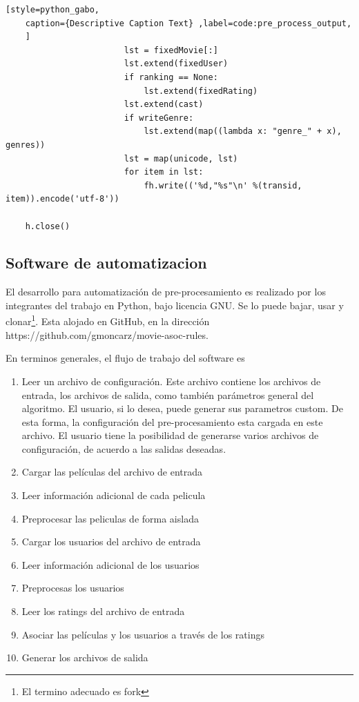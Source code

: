 \documentclass[journal]{IEEEtran}
\begin{document}
\begin{lstlisting}[style=python_gabo,
	caption={Descriptive Caption Text} ,label=code:pre_process_output,
	]
                        lst = fixedMovie[:]
                        lst.extend(fixedUser)
                        if ranking == None:
                            lst.extend(fixedRating)
                        lst.extend(cast)
                        if writeGenre:
                            lst.extend(map((lambda x: "genre_" + x), genres))
                        lst = map(unicode, lst)
                        for item in lst:
                            fh.write(('%d,"%s"\n' %(transid, item)).encode('utf-8'))

    h.close()
\end{lstlisting}


\subsection{Software de automatizacion}
El desarrollo para automatización de pre-procesamiento es realizado por 
los integrantes del trabajo en Python, bajo licencia GNU. Se lo puede bajar,
usar y clonar\footnote{El termino adecuado es fork}. Esta alojado en GitHub, en la 
dirección https://github.com/gmoncarz/movie-asoc-rules. 

En terminos generales, el flujo de trabajo del software es
\begin{enumerate}
\item Leer un archivo de configuración. Este archivo 
contiene los archivos de entrada, los archivos de salida,
como también parámetros general del algoritmo.
El usuario, si lo desea, puede generar sus parametros custom. De
esta forma, la configuración del pre-procesamiento esta cargada en este
archivo. El usuario tiene la posibilidad de generarse varios archivos
de configuración, de acuerdo a las salidas deseadas.
\item Cargar las películas del archivo de entrada
\item Leer información adicional de cada pelicula
\item Preprocesar las peliculas de forma aislada
\item Cargar los usuarios del archivo de entrada
\item Leer información adicional de los usuarios
\item Preprocesas los usuarios
\item Leer los ratings del archivo de entrada
\item Asociar las películas y los usuarios a través de los ratings
\item Generar los archivos de salida
\end{enumerate}
\end{document}
